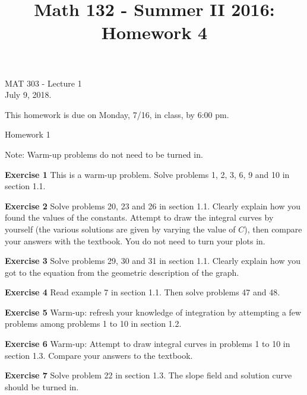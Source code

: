 \documentclass[12pt,oneside]{exam}
\title{Math 132 - Summer II 2016: Homework 4}
\newenvironment{exercise}[1]{\vspace{.1in}\noindent\textbf{Exercise #1 \hspace{.05em}}}{}
\begin{document}
\begin{flushright}
\sc MAT 303 - Lecture 1\\
July 9, 2018.
\end{flushright}
\bigskip

This homework is due on Monday, 7/16, in class, by 6:00 pm. 
\begin{center}
\textsf{Homework 1} 
\end{center}


Note: Warm-up problems do not need to be turned in. 

\begin{exercise}{1}
This is a warm-up problem. Solve problems 1, 2, 3, 6, 9 and 10 in section 1.1. 
\end{exercise}

\begin{exercise}{2}
Solve problems 20, 23 and 26 in section 1.1. Clearly explain how you found the values of the constants. Attempt to draw the integral curves by yourself (the various solutions are given by varying the value of $C$), then compare your  answers with the textbook. You do not need to turn your plots in. 
\end{exercise}

\begin{exercise}{3}
Solve problems 29, 30 and 31 in section 1.1. Clearly explain how you got to the equation from the geometric description of the graph. 
\end{exercise}

\begin{exercise}{4}
Read example 7 in section 1.1. Then solve problems 47 and 48. 
\end{exercise}

\begin{exercise}{5}
Warm-up: refresh your knowledge of integration by attempting a few problems among problems 1 to 10 in section 1.2. 
\end{exercise}

\begin{exercise}{6} 
Warm-up: Attempt to draw integral curves in problems 1 to 10 in section 1.3. Compare your answers to the textbook. 
\end{exercise}

\begin{exercise}{7}
Solve problem 22 in section 1.3. The slope field and solution curve should be turned in. 
\end{exercise}
\end{document}
